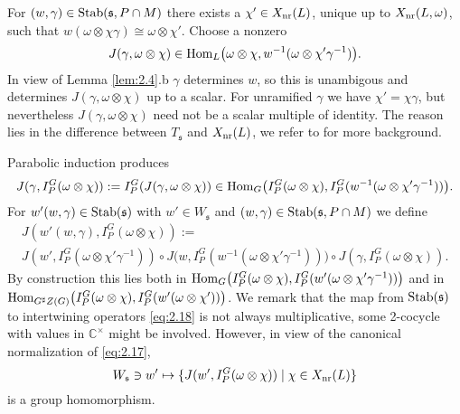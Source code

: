 \documentclass[11pt]{amsart}
\theoremstyle{definition}
\begin{document}
For $(w,\gamma) \in {{\rm Stab}} ({{\mathfrak s}},P \cap M)$ there exists a $\chi' \in X_{{\rm nr}} (L)$, unique
up to $X_{{\rm nr}} (L,\omega)$, such that 
$w (\omega \otimes \chi \gamma) \cong \omega \otimes \chi'$. Choose a nonzero
\begin{equation}\label{eq:2.22}
J(\gamma,\omega \otimes \chi) \in 
{{\rm Hom}}_L \big( \omega \otimes \chi, w^{-1}(\omega \otimes \chi' \gamma^{-1}) \big) .
\end{equation}
In view of Lemma \ref{lem:2.4}.b $\gamma$ determines $w$, so this is unambigous and
determines $J(\gamma,\omega \otimes \chi)$ up to a scalar. 
For unramified $\gamma$ we have $\chi' = \chi \gamma$, but nevertheless 
$J(\gamma,\omega \otimes \chi)$ need not be a scalar multiple of identity. The reason
lies in the difference between $T_{{\mathfrak s}}$ and $X_{{\rm nr}} (L)$, we refer to \cite[\S V]{Wal}
for more background.

Parabolic induction produces
\begin{equation}
J(\gamma,I_P^G (\omega \otimes \chi)) := I_P^G ( J(\gamma,\omega \otimes \chi)) \in
{{\rm Hom}}_G \big( I_P^G (\omega \otimes \chi), I_P^G (w^{-1}(\omega \otimes \chi' \gamma^{-1})) \big) .
\end{equation}
For $w'(w , \gamma) \in {{\rm Stab}} ({{\mathfrak s}})$ with $w' \in W_{{\mathfrak s}}$ and 
$(w,\gamma) \in {{\rm Stab}} ({{\mathfrak s}},P\cap M)$ we define
\begin{multline}\label{eq:2.18}
J(w' (w,\gamma), I_P^G (\omega \otimes \chi)) := \\
J(w',I_P^G(\omega \otimes \chi' \gamma^{-1})) \circ  J \big( w, I_P^G (w^{-1}(\omega 
\otimes \chi' \gamma^{-1})) \big) \circ J(\gamma,I_P^G (\omega \otimes \chi)) .
\end{multline}
By construction this lies both in ${{\rm Hom}}_G \big( I_P^G (\omega \otimes \chi),
I_P^G (w'(\omega \otimes \chi' \gamma^{-1})) \big)$ and in \\
${{\rm Hom}}_{G^\sharp Z(G)} \big( I_P^G (\omega \otimes \chi),I_P^G (w'(\omega \otimes \chi')) \big)$.
We remark that the map from ${{\rm Stab}} ({{\mathfrak s}})$ to intertwining operators \eqref{eq:2.18}
is not always multiplicative, some 2-cocycle with values in ${\mathbb C}^\times$ might be 
involved. However, in view of the canonical normalization of \eqref{eq:2.17},
\begin{equation}
W_{{\mathfrak s}} \ni w' \mapsto \{ J(w',I_P^G (\omega \otimes \chi)) \mid \chi \in X_{{\rm nr}} (L) \} 
\end{equation}
is a group homomorphism.
\end{document}
